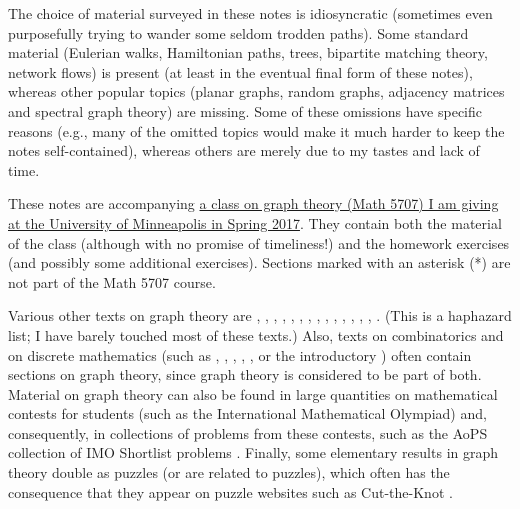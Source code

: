 \documentclass[numbers=enddot,12pt,final,onecolumn,notitlepage]{scrartcl}%
\theoremstyle{definition}
\begin{document}
The choice of material surveyed in these notes is idiosyncratic
(sometimes even purposefully trying to wander some seldom trodden
paths). Some standard material (Eulerian walks, Hamiltonian paths,
trees, bipartite matching theory, network flows) is present (at least
in the eventual final form of these notes), whereas
other popular topics (planar graphs, random graphs, adjacency matrices
and spectral graph theory) are missing. Some of these omissions have
specific reasons (e.g., many of the omitted topics would make it much
harder to keep the notes self-contained), whereas others are merely
due to my tastes and lack of time.

These notes are accompanying
\href{http://www.math.umn.edu/~dgrinber/5707s17/}{a
class on graph theory (Math 5707) I am giving at the University of
Minneapolis in Spring 2017}. They contain both the
material of the class (although with no promise of timeliness!) and the
homework exercises (and possibly some additional exercises).
Sections marked with an asterisk (*) are not part of the Math 5707
course.

Various other texts on graph theory are \cite{Bollob79},
\cite{Bollob98},
\cite{BonMur76}, \cite{Ore62}, \cite{BehCha71}, \cite{BeChZh15},
\cite{BonMur08}, \cite{Ruohon13}, \cite{Dieste16}, \cite{Ore90},
\cite{HaHiMo08}, \cite{Berge91}, \cite{ChaLes15}, \cite{Griffi15},
\cite{Wilson96}.
(This is a haphazard list; I have barely touched most of these texts.)
Also, texts on combinatorics and on discrete mathematics (such as
\cite{BenWil12}, \cite{KelTro15}, \cite{PoTaWo83}, \cite{Bona11},
\cite{Guicha16},
or the introductory \cite{LoPeVe03}) often contain
sections on graph theory, since graph theory is considered to be part
of both.
Material on graph theory can also be found in large quantities on
mathematical contests for students (such as the International
Mathematical Olympiad) and, consequently, in collections of problems
from these contests, such as the AoPS collection of IMO Shortlist
problems \cite{AoPS-ISL}.
Finally, some elementary results in graph theory double as puzzles
(or are related to puzzles), which often has the consequence that they
appear on puzzle websites such as Cut-the-Knot \cite{cut-the-knot}.
\end{document}
